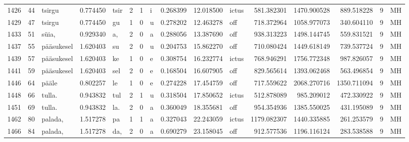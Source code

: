 \begin{tabular}{lrlrllllrrlrrrll}
1426 &          44 &           tsirgu &  0.774450 &    tsir &        2 &      1 &       i &      0.268399 &     12.018500 &  ictus &   581.382301 &  1470.900528 &   889.518228 &      9 &        MH \\
1429 &          47 &           tsirgu &  0.774450 &      gu &        1 &      0 &       u &      0.278202 &     12.463278 &    off &   718.372964 &  1058.977073 &   340.604110 &      9 &        MH \\
1433 &          51 &            süia, &  0.929340 &      a, &        2 &      0 &       a &      0.288056 &     13.387690 &    off &   938.313223 &  1498.144745 &   559.831521 &      9 &        MH \\
1437 &          55 &       pääsukesel &  1.620403 &      su &        2 &      0 &       u &      0.204753 &     15.862270 &    off &   710.080424 &  1449.618149 &   739.537724 &      9 &        MH \\
1439 &          57 &       pääsukesel &  1.620403 &      ke &        1 &      0 &       e &      0.308754 &     16.232774 &  ictus &   768.946291 &  1756.772348 &   987.826057 &      9 &        MH \\
1441 &          59 &       pääsukesel &  1.620403 &     sel &        2 &      0 &       e &      0.168504 &     16.607905 &    off &   829.565614 &  1393.062468 &   563.496854 &      9 &        MH \\
1446 &          64 &            pääle &  0.802257 &      le &        1 &      0 &       e &      0.274228 &     17.454759 &    off &   717.559622 &  2068.270716 &  1350.711094 &      9 &        MH \\
1448 &          66 &           tulla. &  0.943832 &     tul &        2 &      1 &       u &      0.318504 &     17.850652 &  ictus &   512.878089 &   985.209012 &   472.330922 &      9 &        MH \\
1451 &          69 &           tulla. &  0.943832 &     la. &        2 &      0 &       a &      0.360049 &     18.355681 &    off &   954.354936 &  1385.550025 &   431.195089 &      9 &        MH \\
1462 &          80 &          palada, &  1.517278 &      pa &        1 &      1 &       a &      0.327043 &     22.243059 &  ictus &  1179.082307 &  1440.335885 &   261.253579 &      9 &        MH \\
1466 &          84 &          palada, &  1.517278 &     da, &        2 &      0 &       a &      0.690279 &     23.158045 &    off &   912.577536 &  1196.116124 &   283.538588 &      9 &        MH \\

\end{tabular}

